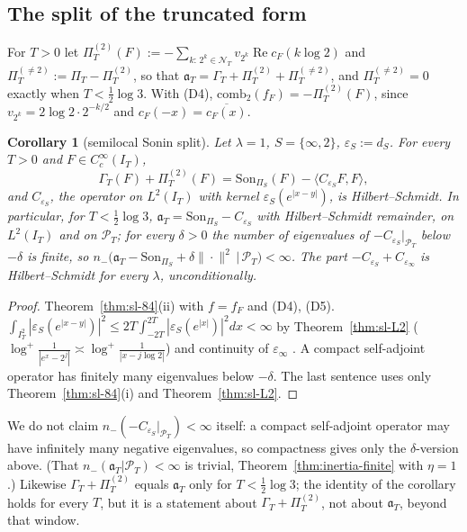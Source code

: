 \documentclass[11pt]{amsart}
\newtheorem{corollary}[theorem]{Corollary}
\theoremstyle{definition}
\theoremstyle{remark}
\newcommand{\Rel}{\operatorname{Re}}
\newcommand{\PT}{\mathcal P_T}
\newcommand{\IT}{I_T}
\newcommand{\cF}{c_F}
\newcommand{\NT}{\mathcal N_T}
\newcommand{\PiT}{\Pi_T}
\begin{document}
\subsection{The split of the truncated form}\label{subsec:sl-split}
For $T>0$ let $\Pi^{(2)}_T(F):=-\sum_{k:\,2^k\in\NT}v_{2^k}\Rel\cF(k\log2)$ and
$\Pi^{(\ne2)}_T:=\PiT-\Pi^{(2)}_T$, so that $\mathfrak a_T=\Gamma_T+\Pi^{(2)}_T+\Pi^{(\ne2)}_T$, and
$\Pi^{(\ne2)}_T=0$ exactly when $T<\frac12\log3$. With (D4), $\mathrm{comb}_2(f_F)=-\Pi^{(2)}_T(F)$, since
$v_{2^k}=2\log2\cdot2^{-k/2}$ and $\cF(-x)=\overline{\cF(x)}$.

\begin{corollary}[semilocal Sonin split]\label{cor:sl-split}
Let $\lambda=1$, $S=\{\infty,2\}$, $\varepsilon_S:=d_S$. For every $T>0$ and $F\in C_c^\infty(\IT)$,
\[
\Gamma_T(F)+\Pi^{(2)}_T(F)=\mathrm{Son}_{\Pi_S}(F)-\langle C_{\varepsilon_S}F,F\rangle ,
\]
and $C_{\varepsilon_S}$, the operator on $L^2(\IT)$ with kernel $\varepsilon_S(e^{|x-y|})$, is Hilbert--Schmidt. In
particular, for $T<\frac12\log3$, $\mathfrak a_T=\mathrm{Son}_{\Pi_S}-C_{\varepsilon_S}$ with Hilbert--Schmidt remainder, on
$L^2(\IT)$ and on $\PT$; for every $\delta>0$ the number of eigenvalues of $-C_{\varepsilon_S}|_{\PT}$ below $-\delta$ is
finite, so $n_-\big(\mathfrak a_T-\mathrm{Son}_{\Pi_S}+\delta\|\cdot\|^2\,\big|\,\PT\big)<\infty$. The part
$-C_{\varepsilon_S}+C_{\varepsilon_\infty}$ is Hilbert--Schmidt for every $\lambda$, unconditionally.
\end{corollary}
\begin{proof}
Theorem~\ref{thm:sl-84}(ii) with $f=f_F$ and (D4), (D5). $\int_{I_T^2}|\varepsilon_S(e^{|x-y|})|^2\le2T\int_{-2T}^{2T}|\varepsilon_S(e^{|x|})|^2dx<\infty$
by Theorem~\ref{thm:sl-L2} ($\log^+\frac1{|e^x-2^j|}\asymp\log^+\frac1{|x-j\log2|}$) and continuity of $\varepsilon_\infty$
\cite[(84)]{ConnesConsani2021}. A compact self-adjoint operator has finitely many eigenvalues below $-\delta$.
The last sentence uses only Theorem~\ref{thm:sl-84}(i) and Theorem~\ref{thm:sl-L2}.
\end{proof}
We do not claim $n_-(-C_{\varepsilon_S}|_{\PT})<\infty$ itself: a compact self-adjoint operator may have infinitely
many negative eigenvalues, so compactness gives only the $\delta$-version above. (That $n_-(\mathfrak a_T|\PT)<\infty$
is trivial, Theorem~\ref{thm:inertia-finite} with $\eta=1$.) Likewise $\Gamma_T+\Pi^{(2)}_T$ equals $\mathfrak a_T$ only
for $T<\frac12\log3$; the identity of the corollary holds for every $T$, but it is a statement about
$\Gamma_T+\Pi^{(2)}_T$, not about $\mathfrak a_T$, beyond that window.
\end{document}
